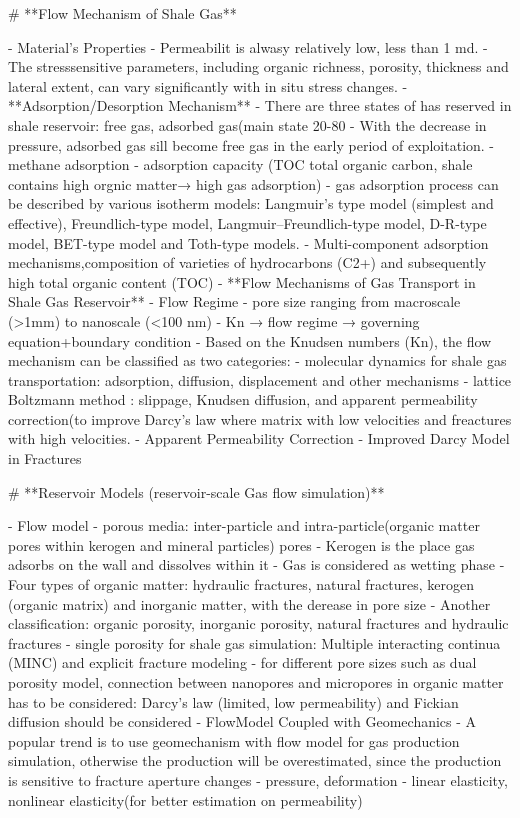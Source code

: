 # **Flow Mechanism of Shale Gas**

- Material’s Properties
    - Permeabilit is alwasy relatively low, less than 1 md.
    - The stresssensitive parameters, including organic richness, porosity, thickness and lateral extent, can vary significantly with in situ stress changes.
- **Adsorption/Desorption Mechanism**
    - There are three states of has reserved in shale reservoir: free gas, adsorbed gas(main state 20-80%
    - With the decrease in pressure, adsorbed gas sill become free gas in the early period of exploitation.
    - methane adsorption
    - adsorption capacity (TOC total organic carbon, shale contains high orgnic matter→ high gas adsorption)
    - gas adsorption process can be described by various isotherm models: Langmuir’s type model (simplest and effective), Freundlich-type model, Langmuir–Freundlich-type model, D-R-type model, BET-type model and Toth-type models.
    - Multi-component adsorption mechanisms,composition of varieties of hydrocarbons (C2+) and subsequently high total organic content
    (TOC)
- **Flow Mechanisms of Gas Transport in Shale Gas Reservoir**
    - Flow Regime
        - pore size ranging from macroscale (>1mm) to nanoscale (<100 nm)
        - Kn → flow regime → governing equation+boundary condition
    - Based on the Knudsen numbers (Kn), the flow mechanism can be classified as two categories:
        - molecular dynamics for shale gas transportation: adsorption, diffusion, displacement and other mechanisms
        - lattice Boltzmann method : slippage, Knudsen diffusion, and apparent permeability correction(to improve Darcy’s law where matrix with low velocities and freactures with high velocities.
        - Apparent Permeability Correction
        - Improved Darcy Model in Fractures

# **Reservoir Models (reservoir-scale Gas flow  simulation)**

- Flow model
    - porous media: inter-particle and intra-particle(organic matter pores within kerogen and mineral particles) pores
    - Kerogen is the place gas adsorbs on the wall and dissolves within it
    - Gas is considered as wetting phase
    - Four types of organic matter: hydraulic fractures, natural fractures,
    kerogen (organic matrix) and inorganic matter, with the derease in pore size
    - Another classification: organic porosity, inorganic porosity, natural fractures and hydraulic fractures
    - single porosity for shale gas simulation: Multiple interacting continua (MINC) and explicit fracture modeling
    - for different pore sizes such as dual porosity model, connection between nanopores and micropores in organic matter has to be considered: Darcy’s law (limited, low permeability) and Fickian diffusion should be considered
- FlowModel Coupled with Geomechanics
    - A popular trend is to use geomechanism with flow model for gas production simulation, otherwise the production will be overestimated, since the production is sensitive to fracture aperture changes
    - pressure, deformation
    - linear elasticity, nonlinear elasticity(for better estimation on permeability)

